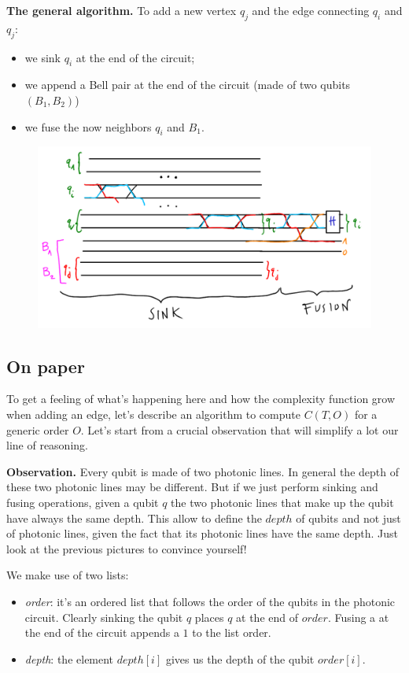 \documentclass{article}
\begin{document}
\textbf{The general algorithm.} To add a new vertex $q_j$ and the edge connecting $q_i$ and $q_j$:
\begin{itemize}
    \item we sink $q_i$ at the end of the circuit;
    \item we append a Bell pair at the end of the circuit (made of two qubits $(B_1, B_2)$)
    \item we fuse the now neighbors $q_i$ and $B_1$.
\end{itemize}
\begin{figure}[H]
    \includegraphics[width=\textwidth]{pics/general_algorithm.png}
\end{figure}


\subsection{On paper}
To get a feeling of what's happening here and how the complexity function grow when adding an edge, let's describe an algorithm to compute $C(T, O)$ for a generic order $O$. Let's start from a crucial observation that will simplify a lot our line of reasoning.

\textbf{Observation.} Every qubit is made of two photonic lines. In general the depth of these two photonic lines may be different. But if we just perform sinking and fusing operations, given a qubit $q$ the two photonic lines that make up the qubit have always the same depth. This allow to define the $depth$ of qubits and not just of photonic lines, given the fact that its photonic lines  have the same depth. Just look at the previous pictures to convince yourself!

We make use of two lists:
\begin{itemize}
    \item \textit{order}: it's an ordered list that follows the order of the qubits in the photonic circuit. Clearly sinking the qubit $q$ places $q$ at the end of $order$. Fusing a at the end of the circuit appends a $1$ to the list order.
    \item \textit{depth}: the element $depth[i]$ gives us the depth of the qubit $order[i]$.
\end{itemize}
\end{document}
